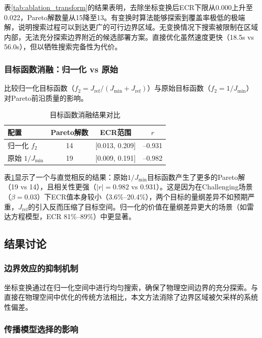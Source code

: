 表\ref{tab:ablation_transform}的结果表明，去除坐标变换后ECR下限从0.000上升至0.022，Pareto解数量从15降至13。有变换时算法能够探索到覆盖率极低的极端解，说明搜索过程可以到达更广的可行边界区域。无变换情况下搜索被限制在区域内部，无法充分探索边界附近的候选部署方案。直接优化虽然速度更快（18.5s vs 56.0s），但以牺牲搜索完备性为代价。

\subsubsection{目标函数消融：归一化 vs 原始}

比较归一化目标函数（$f_2 = J_{\text{ref}}/(J_{\min}+J_{\text{ref}})$）与原始目标函数（$f_2 = 1/J_{\min}$）对Pareto前沿质量的影响。

\begin{table}[t]
\centering
\caption{目标函数消融结果对比}
\label{tab:ablation_norm}
\begin{tabular}{lccc}
\toprule
配置 & Pareto解数 & ECR范围 & $r$ \\
\midrule
归一化 $f_2$ & 14 & [0.013, 0.209] & --0.931 \\
原始 $1/J_{\min}$ & 19 & [0.009, 0.191] & --0.982 \\
\bottomrule
\end{tabular}
\end{table}

表\ref{tab:ablation_norm}显示了一个与直觉相反的结果：原始$1/J_{\min}$目标函数产生了更多的Pareto解（19 vs 14），且相关性更强（$|r|=0.982$ vs 0.931）。这是因为在Challenging场景（$\beta=0.03$）下ECR值本身较小（3.6\%--20.4\%），两个目标的量纲差异不如预期严重，$J_{\text{ref}}$的引入反而压缩了目标空间。归一化的价值在量纲差异更大的场景（如雷达方程模型，ECR 81\%--89\%）中更显著。

\subsection{结果讨论}

\subsubsection{边界效应的抑制机制}

坐标变换通过在归一化空间中进行均匀搜索，确保了物理空间边界的充分探索。与直接在物理空间中优化的传统方法相比，本文方法消除了边界区域被欠采样的系统性偏差。

\subsubsection{传播模型选择的影响}

